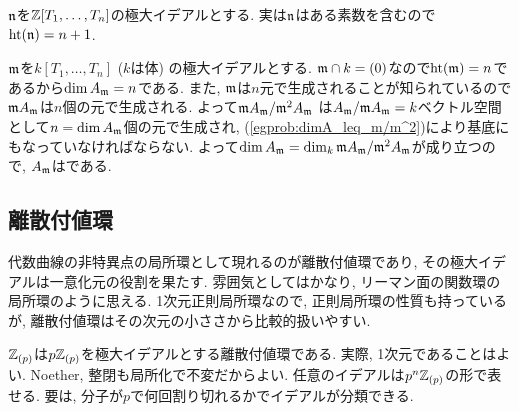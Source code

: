 \begin{eg}
\ben
\item $\mathfrak{n}$を$\mathbb{Z}[T_1,\dots, T_n]$の極大イデアルとする. 実は$\mathfrak{n}$はある素数を含むので$\mathrm{ht}(\mathfrak{n}) = n+1$.
\item $\mathfrak{m}$を$k[T_1,\dots, T_n]$ ($k$は体) の極大イデアルとする. $\mathfrak{m}\cap k = (0)$なので$\mathrm{ht}(\mathfrak{m}) = n$であるから$\dim{A_{\mathfrak{m}}} = n$である.  また, $\mathfrak{m}$は$n$元で生成されることが知られているので$\mathfrak{m}A_{\mathfrak{m}}$は$n$個の元で生成される. よって$\mathfrak{m}A_{\mathfrak{m}}/\mathfrak{m}^2A_{\mathfrak{m}}$ は$A_{\mathfrak{m}}/\mathfrak{m}A_{\mathfrak{m}} = k$ベクトル空間として$n = \dim{A_{\mathfrak{m}}}$個の元で生成され, (\ref{egprob:dimA_leq_m/m^2})により基底にもなっていなければならない. よって$\dim{A_{\mathfrak{m}}} = \dim_{k}\mathfrak{m}A_{\mathfrak{m}}/\mathfrak{m}^2A_{\mathfrak{m}}$が成り立つので, $A_{\mathfrak{m}}$はである.
\een
\end{eg}





\subsection{離散付値環}
代数曲線の非特異点の局所環として現れるのが離散付値環であり, その極大イデアルは一意化元の役割を果たす. 雰囲気としてはかなり, リーマン面の関数環の局所環のように思える. 1次元正則局所環なので, 正則局所環の性質も持っているが, 離散付値環はその次元の小ささから比較的扱いやすい.


\begin{eg}
$\mathbb{Z}_{(p)}$は$p\mathbb{Z}_{(p)}$を極大イデアルとする離散付値環である. 実際, 1次元であることはよい. Noether, 整閉も局所化で不変だからよい. 任意のイデアルは$p^n\mathbb{Z}_{(p)}$の形で表せる. 要は, 分子が$p$で何回割り切れるかでイデアルが分類できる.
\end{eg}


